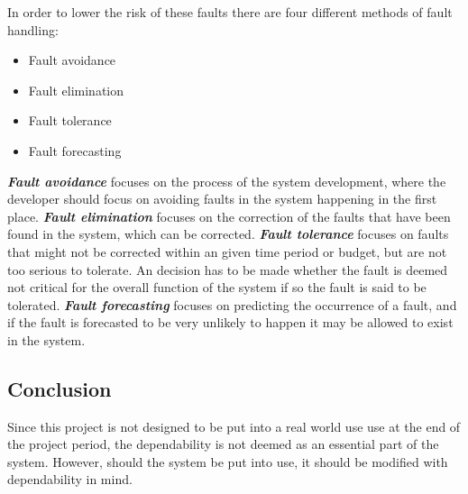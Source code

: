 In order to lower the risk of these faults there are four different methods of fault handling:
\begin{itemize}
\item Fault avoidance
\item Fault elimination
\item Fault tolerance
\item Fault forecasting
\end{itemize}
\textit{\textbf{Fault avoidance}} focuses on the process of the system development, where the developer should focus on avoiding faults in the system happening in the first place.
\textit{\textbf{Fault elimination}} focuses on the correction of the faults that have been found in the system, which can be corrected. 
\textit{\textbf{Fault tolerance}} focuses on faults that might not be corrected within an given time period or budget, but are not too serious to tolerate.
An decision has to be made whether the fault is deemed not critical for the overall function of the system if so the fault is said to be tolerated.
\textit{\textbf{Fault forecasting}} focuses on predicting the occurrence of a fault, and if the fault is forecasted to be very unlikely to happen it may be allowed to exist in the system. 

\subsection{Conclusion}
Since this project is not designed to be put into a real world use use at the end of the project period, the dependability is not deemed as an essential part of the system. 
However, should the system be put into use, it should be modified with dependability in mind. 
